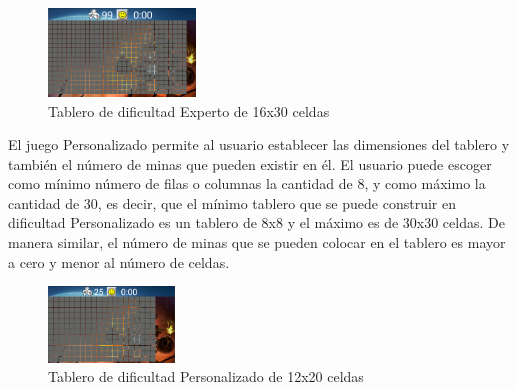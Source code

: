 \documentclass[11pt]{article} %
\begin{document}
\begin{center}

	\begin{figure}[h!]
  		\centering
    		\includegraphics[width=0.35\textwidth]{imagenes/tableroDificil.PNG}
  		\caption{Tablero de dificultad Experto de 16x30 celdas}
		\label{fig:tableroexperto}
	\end{figure}
\end{center} 

El juego Personalizado permite al usuario establecer las dimensiones del tablero y tambi\'en el n\'umero de minas que pueden existir en \'el. El usuario puede escoger como m\'inimo n\'umero de filas o columnas la cantidad de 8, y como m\'aximo la cantidad de 30, es decir, que el m\'inimo tablero que se puede construir en dificultad Personalizado es un tablero de 8x8 y el m\'aximo es de 30x30 celdas. De manera similar, el n\'umero de minas que se pueden colocar en el tablero es mayor a cero y menor al n\'umero de celdas. 

\begin{center}

	\begin{figure}[h!]
  		\centering
    		\includegraphics[width=0.3\textwidth]{imagenes/tableroPersonalizado.PNG}
  		\caption{Tablero de dificultad Personalizado de 12x20 celdas}
		\label{fig:tableropersonalizado}
	\end{figure}
\end{center} 
\end{document}
